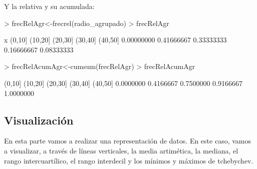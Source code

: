 \documentclass [a4paper] {article}
\begin{document}
Y la relativa y su acumulada:

\begin{Schunk}
\begin{Sinput}
> frecRelAgr<-frecrel(radio_agrupado)
> frecRelAgr
\end{Sinput}
\begin{Soutput}
x
    (0,10]    (10,20]    (20,30]    (30,40]    (40,50] 
0.00000000 0.41666667 0.33333333 0.16666667 0.08333333 
\end{Soutput}
\begin{Sinput}
> frecRelAcumAgr<-cumsum(frecRelAgr)
> frecRelAcumAgr
\end{Sinput}
\begin{Soutput}
   (0,10]   (10,20]   (20,30]   (30,40]   (40,50] 
0.0000000 0.4166667 0.7500000 0.9166667 1.0000000 
\end{Soutput}
\end{Schunk}


\subsection{Visualización}
En esta parte vamos a realizar una representación de datos. En este caso, vamos a visualizar, a través de líneas
verticales, la media artimética, la mediana, el rango intercuartílico, el rango interdecil y los mínimos y máximos de tchebychev.
\end{document}
